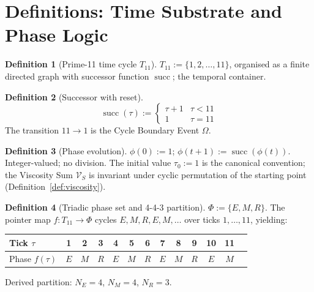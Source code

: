 \documentclass[11pt, letterpaper]{article}
\renewcommand{\succ}{\operatorname{succ}}
\newcommand{\Tcyc}{T_{11}}
\newcommand{\PhiSet}{\Phi}
\newcommand{\VS}{\mathcal{V}_S}
\theoremstyle{definition}
\newtheorem{definition}{Definition}[section]
\theoremstyle{plain}
\begin{document}
\newpage


\section{Definitions: Time Substrate and Phase Logic}\label{sec:time}

\begin{definition}[Prime-11 time cycle $\Tcyc$]\label{def:T11}
$\Tcyc:=\{1,2,\dots,11\}$, organised as a finite directed graph with
successor function $\succ$; the temporal container.
\end{definition}

\begin{definition}[Successor with reset]\label{def:succ}
\[
\succ(\tau):=\begin{cases}\tau+1 & \tau<11 \\ 1 & \tau=11\end{cases}
\]
The transition $11\to 1$ is the Cycle Boundary Event $\Omega$.
\end{definition}

\begin{definition}[Phase evolution]\label{def:phase-evol}
$\phi(0):=1$; $\phi(t+1):=\succ(\phi(t))$.  Integer-valued; no division.
The initial value $\tau_0:=1$ is the canonical convention; the Viscosity Sum
$\VS$ is invariant under cyclic permutation of the starting point
(Definition~\ref{def:viscosity}).
\end{definition}

\begin{definition}[Triadic phase set and 4-4-3 partition]\label{def:443}
$\PhiSet:=\{E,M,R\}$.  The pointer map $f:\Tcyc\to\PhiSet$ cycles
$E,M,R,E,M,\dots$ over ticks $1,\dots,11$, yielding:

\medskip
\begin{center}
\begin{tabular}{lcccccccccccc}
\toprule
Tick $\tau$ & 1 & 2 & 3 & 4 & 5 & 6 & 7 & 8 & 9 & 10 & 11 \\
\midrule
Phase $f(\tau)$ & $E$ & $M$ & $R$ & $E$ & $M$ & $R$ & $E$ & $M$
  & $R$ & $E$ & $M$ \\
\bottomrule
\end{tabular}
\end{center}
\medskip

Derived partition: $N_E=4$, $N_M=4$, $N_R=3$.
\end{definition}
\end{document}
